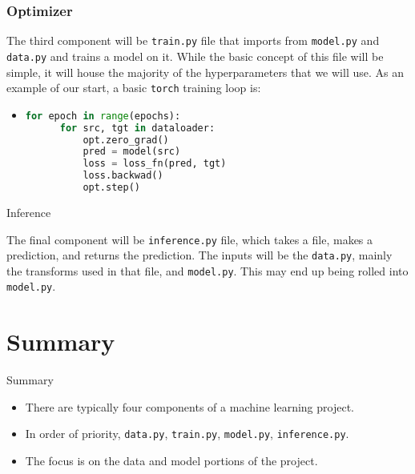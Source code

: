 \documentclass{beamer}
\begin{document}
\begin{frame}[fragile]
\frametitle{Optimizer}

  The third component will be \texttt{train.py} file that imports from \texttt{model.py}
  and \texttt{data.py} and trains a model on it.
  While the basic concept of this file will be simple, it will house the majority of the
  hyperparameters that we will use.
  As an example of our start, a basic \texttt{torch} training loop is:
  \begin{itemize}
  \item 
  \begin{lstlisting}[language=Python]
  for epoch in range(epochs):
      for src, tgt in dataloader:
          opt.zero_grad()
          pred = model(src)
          loss = loss_fn(pred, tgt)
          loss.backwad()
          opt.step()
  \end{lstlisting}
  \end{itemize}
\end{frame}

\begin{frame}{Inference}

  The final component will be \texttt{inference.py} file, which takes a file, makes a
  prediction, and returns the prediction.
  The inputs will be the \texttt{data.py}, mainly the transforms used in that file, and
  \texttt{model.py}.
  This may end up being rolled into \texttt{model.py}.
\end{frame}


\section*{Summary}

\begin{frame}{Summary}

  \begin{itemize}
    \item
    There are \alert{typically four components} of a machine learning project.
    \item
    In order of priority, \texttt{data.py}, \texttt{train.py}, \texttt{model.py},
    \texttt{inference.py}.
    \item
    The focus is on the \alert{data and model} portions of the project.
  \end{itemize}
  
\end{frame}
\end{document}
